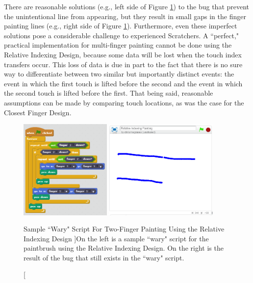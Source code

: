 There are reasonable solutions (e.g., left side of Figure \ref{WaryTwoFingerPaintingRID}) to the bug that prevent the unintentional line from appearing, but they result in small gaps in the finger painting lines (e.g., right side of Figure \ref{WaryTwoFingerPaintingRID}). Furthermore, even these imperfect solutions pose a considerable challenge to experienced Scratchers. A ``perfect," practical implementation for multi-finger painting cannot be done using the Relative Indexing Design, because some data will be lost when the touch index transfers occur. This loss of data is due in part to the fact that there is no sure way to differentiate between two similar but importantly distinct events: the event in which the first touch is lifted before the second and the event in which the second touch is lifted before the first. That being said, reasonable assumptions can be made by comparing touch locations, as was the case for the Closest Finger Design. 

\begin{figure}
\centering
\includegraphics[width=0.4\textwidth]{images/WaryTwoFingerPaintingRID.PNG}
\includegraphics[width=0.5\textwidth]{images/IndexTransferGapBug.PNG}
\caption[Sample ``Wary" Script For Two-Finger Painting Using the Relative Indexing Design ]{On the left is a sample ``wary" script for the paintbrush using the Relative Indexing Design. On the right is the result of the bug that still exists in the ``wary" script.}
\label{WaryTwoFingerPaintingRID}
\end{figure}

